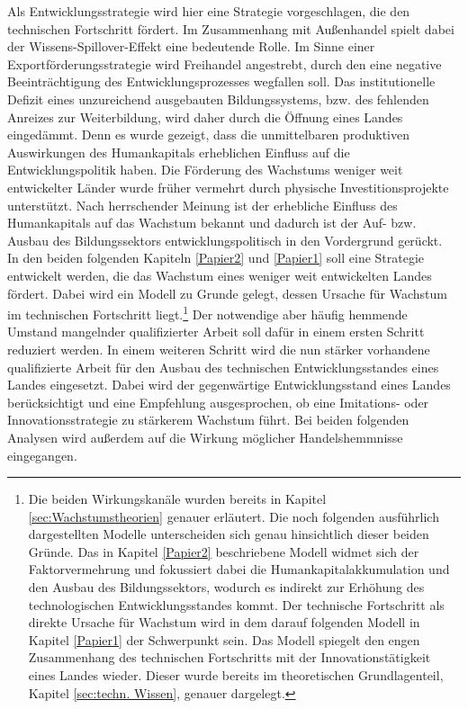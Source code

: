 Als Entwicklungsstrategie wird hier eine Strategie vorgeschlagen, die den technischen Fortschritt f{\"o}rdert. Im Zusammenhang mit Au{\ss}enhandel spielt dabei der Wissens-Spillover-Effekt eine bedeutende Rolle. Im Sinne einer Exportf{\"o}rderungsstrategie wird Freihandel angestrebt, durch den eine negative Beeintr{\"a}chtigung des Entwicklungsprozesses wegfallen soll. Das institutionelle Defizit eines unzureichend ausgebauten Bildungssystems, bzw. des fehlenden Anreizes zur Weiterbildung, wird daher durch die {\"O}ffnung eines Landes einged{\"a}mmt. Denn es wurde gezeigt, dass die unmittelbaren produktiven Auswirkungen des Humankapitals erheblichen Einfluss auf die Entwicklungspolitik haben. Die F{\"o}rderung des Wachstums weniger weit entwickelter L{\"a}nder wurde fr{\"u}her vermehrt durch physische Investitionsprojekte unterst{\"u}tzt. Nach herrschender Meinung ist der erhebliche Einfluss des Humankapitals auf das Wachstum bekannt und dadurch ist der Auf- bzw. Ausbau des Bildungssektors entwicklungspolitisch in den Vordergrund ger{\"u}ckt.\\
In den beiden folgenden Kapiteln \ref{Papier2} und \ref{Papier1} soll eine Strategie entwickelt werden, die das Wachstum eines weniger weit entwickelten Landes f{\"o}rdert. Dabei wird ein Modell zu Grunde gelegt, dessen Ursache f{\"u}r Wachstum im technischen Fortschritt liegt.\footnote{Die beiden Wirkungskan{\"a}le wurden bereits in Kapitel \ref{sec:Wachstumstheorien} genauer erl{\"a}utert. Die noch folgenden ausf{\"u}hrlich dargestellten Modelle unterscheiden sich genau hinsichtlich dieser beiden Gr{\"u}nde. Das in Kapitel \ref{Papier2} beschriebene Modell widmet sich der Faktorvermehrung und fokussiert dabei die Humankapitalakkumulation und den Ausbau des Bildungssektors, wodurch es indirekt zur Erh{\"o}hung des technologischen Entwicklungsstandes kommt. Der technische Fortschritt als direkte Ursache f{\"u}r Wachstum wird in dem darauf folgenden Modell in Kapitel \ref{Papier1} der Schwerpunkt sein. Das Modell spiegelt den engen Zusammenhang des technischen Fortschritts mit der Innovationst{\"a}tigkeit eines Landes wieder. Dieser wurde bereits im theoretischen Grundlagenteil, Kapitel \ref{sec:techn. Wissen}, genauer dargelegt.} Der notwendige aber h{\"a}ufig hemmende Umstand mangelnder qualifizierter Arbeit soll daf{\"u}r in einem ersten Schritt reduziert werden. 
In einem weiteren Schritt wird die nun st{\"a}rker vorhandene qualifizierte Arbeit f{\"u}r den Ausbau des technischen Entwicklungsstandes eines Landes eingesetzt. Dabei wird der gegenw{\"a}rtige Entwicklungsstand eines Landes ber{\"u}cksichtigt und eine Empfehlung ausgesprochen, ob eine Imitations- oder Innovationsstrategie zu st{\"a}rkerem Wachstum f{\"u}hrt. Bei beiden folgenden Analysen wird au{\ss}erdem auf die Wirkung m{\"o}glicher Handelshemmnisse eingegangen. 
%